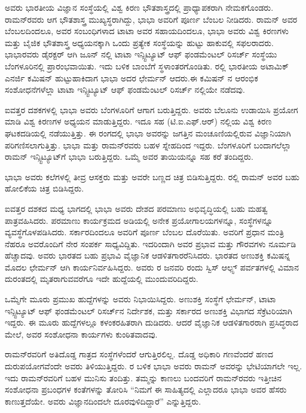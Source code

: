 ಅವರು ಭಾರತೀಯ ವಿಜ್ಞಾನ ಸಂಸ್ಥೆಯಲ್ಲಿ ವಿಶ್ವ ಕಿರಣ ಭೌತಶಾಸ್ತ್ರದಲ್ಲಿ ಪ್ರಾಧ್ಯಾಪಕರಾಗಿ ನೇಮಕಗೊಂಡರು. ರಾಮನ್‍ರವರು ಆಗ ಭೌತಶಾಸ್ತ್ರ ಮುಖ್ಯಸ್ಥರಾಗಿದ್ದು, ಭಾಭಾ ಅವರಿಗೆ ಪೂರ್ಣ ಬೆಂಬಲ ನೀಡಿದರು. ರಾಮನ್ ಅವರ ಬೆಂಬಲದಿಂದಲೂ, ಅವರ ಸಂಬಂಧಿಗಳಾದ ಟಾಟಾ ಅವರ ಸಹಾಯದಿಂದಲೂ, ಭಾಭಾ ಅವರು ವಿಶ್ವ ಕಿರಣಗಳು ಮತ್ತು ಬೈಜಿಕ ಭೌತಶಾಸ್ತ್ರ ಅಧ್ಯಯನಕ್ಕಾಗಿ ಒಂದು ಪ್ರತ್ಯೇಕ ಸಂಸ್ಥೆಯನ್ನು ಹುಟ್ಟು ಹಾಕುವಲ್ಲಿ ಸಫಲರಾದರು. ಭಾಭಾರವರು ಡೈರಕ್ಟರ್ ಆಗಿ  ಜೂನ್ ನಲ್ಲಿ ಟಾಟಾ ಇನ್ಸ್ಟಿಟ್ಯೂಟ್ ಆಫ್ ಫಂಡಮೆಂಟಲ್ ರಿಸರ್ಚ್ ಸಂಸ್ಥೆಯು ಬೆಂಗಳೂರಿನಲ್ಲಿ ಪ್ರಾರಂಭವಾಯಿತು. ಇದು ಬಳಿಕ ಬಾಂಬೆಗೆ ಸ್ಥಳಾಂತರಗೊಂಡಿತು. ರಲ್ಲಿ ಭಾರತೀಯ ಅಟಾಮಿಕ್ ಎನರ್ಜಿ ಕಮಿಷನ್ ಹುಟ್ಟುಹಾಕಿದಾಗ ಭಾಭಾ ಅದರ ಛೇರ್ಮನ್ ಆದರು.\break ಈ ಕಮಿಷನ್ ನ ಆರಂಭಿಕ ಸಂಶೋಧನೆಗಳೆಲ್ಲಾ ಟಾಟಾ ಇನ್ಸ್ಟಿಟ್ಯೂಟ್ ಆಫ್ ಫಂಡಮೆಂಟಲ್ ರಿಸರ್ಚ್ ನಲ್ಲಿಯೇ ನಡೆದವು.

ಐವತ್ತರ ದಶಕಗಳಲ್ಲಿ ಭಾಭಾ ಅವರು ಬೆಂಗಳೂರಿಗೆ ಆಗಾಗ ಬರುತ್ತಿದ್ದರು. ಅವರು ಬೆಲೂನು ಉಡಾಯಿಸಿ ಪ್ರಯೋಗ ಮಾಡಿ ವಿಶ್ವ ಕಿರಣಗಳ ಅಧ್ಯಯನ ಮಾಡುತ್ತಿದ್ದರು. ಇದೂ ಸಹ (ಟಿ.ಐ.ಎಫ್.ಆರ್) ನಲ್ಲಿಯ ವಿಶ್ವ ಕಿರಣ ಘಟಕದಡಿಯಲ್ಲಿ ನಡೆಯುತ್ತಿತ್ತು. ಈ ರಂಗದಲ್ಲಿ ಭಾಭಾ ಅವರನ್ನು ಜಗತ್ತಿನ ಮಂಚೂಣಿಯಲ್ಲಿರುವ ವಿಜ್ಞಾನಿಯಾಗಿ ಪರಿಗಣಿಸಲಾಗುತ್ತಿತ್ತು. ಭಾಭಾ ಮತ್ತು ರಾಮನ್‍ರವರು ಬಹಳ ಸ್ನೇಹದಿಂದ ಇದ್ದರು. ಬೆಂಗಳೂರಿಗೆ ಬಂದಾಗಲೆಲ್ಲಾ ರಾಮನ್ ಇನ್ಸ್ಟಿಟ್ಯೂಟ್‍ಗೆ ಭಾಭಾ ಬರುತ್ತಿದ್ದರು. ಒಮ್ಮೆ ಅವರ ತಾಯಿಯನ್ನೂ ಸಹ ಕರೆ ತಂದಿದ್ದರು.

ಭಾಭಾ ಅವರು ಕಲೆಗಳಲ್ಲಿ ತೀವ್ರ ಆಸಕ್ತರು ಮತ್ತು ಅವರೇ ಬಣ್ಣದ ಚಿತ್ರ ಬಿಡಿಸುತ್ತಿದ್ದರು. ರಲ್ಲಿ ರಾಮನ್ ಅವರ ಬಹು ಹೋಲಿಕೆಯ ಚಿತ್ರ ಬಿಡಿಸಿದ್ದರು.

ಐವತ್ತರ ದಶಕದ ಮಧ್ಯ ಭಾಗದಲ್ಲಿ ಭಾಭಾ ಅವರು ದೇಶದ ಪರಮಾಣು ಅಭಿವೃದ್ಧಿಯಲ್ಲಿ ಬಹು ಮಹತ್ವ ಪಾತ್ರವಹಿಸಿದರು. ಪರಮಾಣು ಕಾರ್ಯಕ್ರಮದ ಅಡಿಯಲ್ಲಿ ಅನೇಕ ಪ್ರಯೋಗಾಲಯ\-ಗಳನ್ನೂ, ಸಂಸ್ಥೆಗಳನ್ನೂ ವ್ಯವಸ್ಥೆಗೊಳಪಡಿಸಿದರು. ಸರ್ಕಾರದಿಂದಲೂ ಅವರಿಗೆ ಪೂರ್ಣ ಬೆಂಬಲ ದೊರೆಯಿತು. ಅವರಿಗೆ ಪ್ರಧಾನ ಮಂತ್ರಿ ನೆಹರೂ ಅವರೊಂದಿಗೆ ನೇರ ಸಂಪರ್ಕ ಸಾಧ್ಯವಿದ್ದಿತು. ಇದರಿಂದಾಗಿ ಅವರ ಪ್ರಭಾವ ಮತ್ತು ಗೌರವಗಳು ನೂರ್ಮಡಿ ಹೆಚ್ಚಾದವು. ಅವರು ಭಾರತದ ಬಹು ಪ್ರಭಾವಿ ವೈಜ್ಞಾನಿಕ ಆಡಳಿತಗಾರರೆನಿಸಿದರು. ಭಾರತದ ಅಣುಶಕ್ತಿ ಕಮಿಷನ್ನ ಮೊದಲ ಛೇರ್ಮನ್ ಆಗಿ ಕಾರ್ಯನಿರ್ವಹಿಸಿದ್ದರು. ಅವರು ರ ಜನವರಿ ರಂದು ಸ್ವಿಸ್ ಆಲ್ಪ್ಸ್ ಪರ್ವತಗಳಲ್ಲಿ ವಿಮಾನ ದುರಂತದಲ್ಲಿ ಮೃತರಾಗುವವರೆಗೂ ಇದೇ ಹುದ್ದೆಯಲ್ಲಿ ಮುಂದುವರಿದಿದ್ದರು.

ಒಮ್ಮೆಗೇ ಮೂರು ಪ್ರಮುಖ ಹುದ್ದೆಗಳನ್ನು ಅವರು ನಿಭಾಯಿಸಿದ್ದರು. ಅಣುಶಕ್ತಿ ಸಂಸ್ಥೆಗೆ ಛೇರ್ಮನ್, ಟಾಟಾ ಇನ್ಸ್ಟಿಟ್ಯೂಟ್ ಆಫ್ ಫಂಡಮೆಂಟಲ್ ರಿಸರ್ಚ್‌ನ ನಿರ್ದೇಶಕ, ಮತ್ತು ಸರ್ಕಾರದ ಅಣುಶಕ್ತಿ ವಿಭಾಗದ ಸೆಕ್ರೆಟರಿಯಾಗಿ ಇದ್ದರು. ಈ ಮೂರು ಹುದ್ದೆಗಳಲ್ಲೂ ಕಳಂಕರಹಿತರಾಗಿ ದುಡಿದರು. ಆದರೆ ವೈಜ್ಞಾನಿಕ ಆಡಳಿತಗಾರರಾಗಿ ಪ್ರಸಿದ್ಧರಾದ ಮೇಲೆ, ಅವರ ಸಂಶೋಧನಾ ಕಾರ್ಯಗಳು ಕುಂಠಿತವಾದವು.

ರಾಮನ್‍ರವರಿಗೆ ಅತಿದೊಡ್ಡ ಗಾತ್ರದ ಸಂಸ್ಥೆಗಳೆಂದರೆ ಆಗುತ್ತಿರಲಿಲ್ಲ. ದೊಡ್ಡ ಅಧಿಕಾರಿ ಗಣವೆಂದರೆ ಹಣದ ದುರುಪಯೋಗವೆಂದೇ ಅವರು ತಿಳಿಯುತ್ತಿದ್ದರು. ರ ಬಳಿಕ ಭಾಭಾ ಅವರು ರಾಮನ್ ಅವರನ್ನು ಭೇಟಿಯಾಗಲೇ ಇಲ್ಲ. ಇದು ರಾಮನ್‍ರವರಿಗೆ ಬಹಳ ಮುನಿಸು ತಂದಿತ್ತು. ತಮ್ಮನ್ನು ಕಾಣಲು ಬಂದವರಿಗೆ ರಾಮನ್‍ರವರು ಇತ್ತೀಚಿನ ಸಂಶೋಧನಾ ಪ್ರಬಂಧಗಳ ಕಂತೆಗಳನ್ನು ತೋರಿಸಿ “ನಿಮಗೆ ಈ ಸಾಹಿತ್ಯದಲ್ಲಿ ಎಲ್ಲಾದರೂ ಭಾಭಾ ಅವರ ಹೆಸರು ಕಾಣುತ್ತದೆಯೇ. ಅವರು ವಿಜ್ಞಾನದಿಂದಲೇ ದೂರವುಳಿದಿದ್ದಾರೆ” ಎನ್ನುತ್ತಿದ್ದರು.


